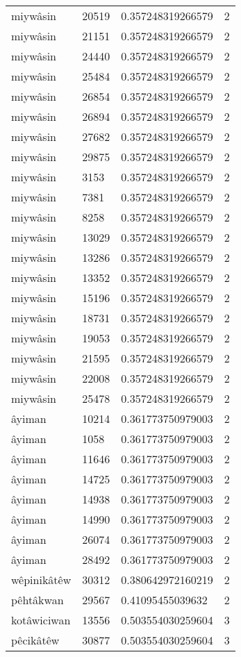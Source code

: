\begin{longtable}{llll}
miywâsin & 20519 & 0.357248319266579 & 2 \\
miywâsin & 21151 & 0.357248319266579 & 2 \\
miywâsin & 24440 & 0.357248319266579 & 2 \\
miywâsin & 25484 & 0.357248319266579 & 2 \\
miywâsin & 26854 & 0.357248319266579 & 2 \\
miywâsin & 26894 & 0.357248319266579 & 2 \\
miywâsin & 27682 & 0.357248319266579 & 2 \\
miywâsin & 29875 & 0.357248319266579 & 2 \\
miywâsin & 3153 & 0.357248319266579 & 2 \\
miywâsin & 7381 & 0.357248319266579 & 2 \\
miywâsin & 8258 & 0.357248319266579 & 2 \\
miywâsin & 13029 & 0.357248319266579 & 2 \\
miywâsin & 13286 & 0.357248319266579 & 2 \\
miywâsin & 13352 & 0.357248319266579 & 2 \\
miywâsin & 15196 & 0.357248319266579 & 2 \\
miywâsin & 18731 & 0.357248319266579 & 2 \\
miywâsin & 19053 & 0.357248319266579 & 2 \\
miywâsin & 21595 & 0.357248319266579 & 2 \\
miywâsin & 22008 & 0.357248319266579 & 2 \\
miywâsin & 25478 & 0.357248319266579 & 2 \\
âyiman & 10214 & 0.361773750979003 & 2 \\
âyiman & 1058 & 0.361773750979003 & 2 \\
âyiman & 11646 & 0.361773750979003 & 2 \\
âyiman & 14725 & 0.361773750979003 & 2 \\
âyiman & 14938 & 0.361773750979003 & 2 \\
âyiman & 14990 & 0.361773750979003 & 2 \\
âyiman & 26074 & 0.361773750979003 & 2 \\
âyiman & 28492 & 0.361773750979003 & 2 \\
wêpinikâtêw & 30312 & 0.380642972160219 & 2 \\
pêhtâkwan & 29567 & 0.41095455039632 & 2 \\
kotâwiciwan & 13556 & 0.503554030259604 & 3 \\
pêcikâtêw & 30877 & 0.503554030259604 & 3 \\

\end{longtable}
